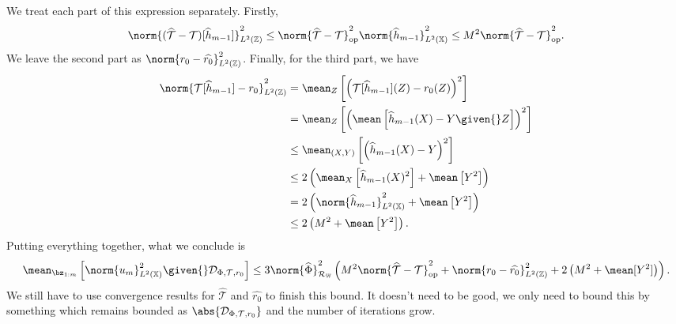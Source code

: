 We treat each part of this expression separately.
Firstly,
\begin{align*}
    \norm{ ( \hat{ \mathcal{T} } - \mathcal{T} ) [ \hat{ h }_{ m-1 } ] }_{ L^2 ( \mathbb{Z} ) }^2
    \leq \norm{ \hat{ \mathcal{T} } - \mathcal{T} }_{ \mathrm{op} }^2 \norm{ \hat{ h }_{ m-1 } }_{ L^2 ( \mathbb{X} ) }^2
    \leq M^2 \norm{ \hat{ \mathcal{T} } - \mathcal{T} }_{ \mathrm{op} }^2
.\end{align*}
We leave the second part as $ \norm{ r_{ 0 } - \hat{ r_{ 0 } } }_{ L^{ 2 } ( \mathbb{Z} ) }^2 $.
Finally, for the third part, we have
\begin{align*}
    \norm{ \mathcal{T} [ \hat{ h }_{ m-1 } ] - r_{ 0 } }_{ L^2 ( \mathbb{Z} ) }^2
    &= \mean_{ Z } \left[
        \left(
            \mathcal{T} [ \hat{ h }_{ m-1 } ] ( Z ) - r_{ 0 } ( Z )
        \right)^2
    \right] \\
    &= \mean_{ Z } \left[
        \left(
            \mean \left[ \hat{ h }_{ m-1 } ( X ) - Y \given{} Z \right]
        \right)^2
    \right] \\
    &\leq \mean_{ ( X, Y ) } \left[
        \left(
            \hat{ h }_{ m-1 } ( X ) - Y
        \right)^2
    \right] \\
    &\leq 2 \left(
        \mean_{ X } \left[ \hat{ h }_{ m-1 } ( X )^2 \right]
        + \mean \left[ Y^2 \right]
    \right) \\
    &= 2 \left(
        \norm{ \hat{ h }_{ m-1 } }_{ L^2 ( \mathbb{X} ) }^2
        + \mean \left[ Y^2 \right]
    \right) \\
    &\leq 2 \left( M^2 + \mean \left[ Y^2 \right] \right)
.\end{align*}
Putting everything together, what we conclude is
\begin{align*}
    \mean_{ \bz_{ 1:m } } \left[
        \norm{ u_{ m } }_{ L^2 ( \mathbb{X} ) }^2 \given{} \dataoff
    \right]
    \leq
    3 \norm{ \hat{ \Phi } }_{ \rkhsw }^2 \left(
        M^2 \norm{ \hat{ \mathcal{T} } - \mathcal{T} }_{ \mathrm{op} }^2
        + \norm{ r_{ 0 } - \hat{ r_{ 0 } } }_{ L^2 ( \mathbb{Z} ) }^2
        + 2 \left( M^2 + \mean [ Y^2 ] \right)
    \right)
.\end{align*}
{\color{red} We still have to use convergence results for $ \hat{ \mathcal{T} } $ and $ \hat{ r_{ 0 } } $ to finish this bound.
It doesn't need to be good, we only need to bound this by something which remains bounded as $ \abs{ \dataoff } $ and the number of iterations grow.}

